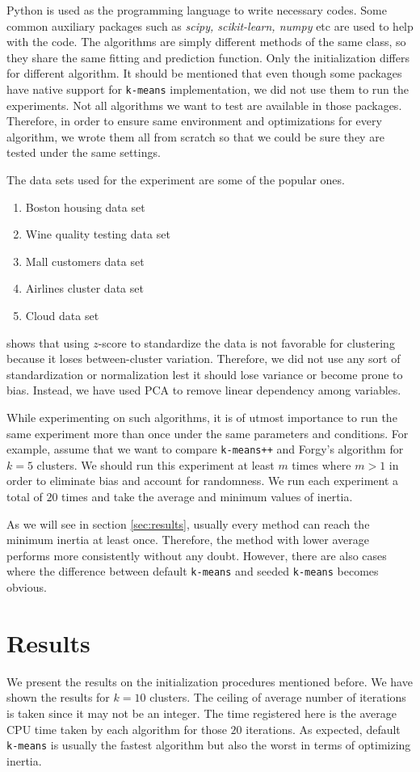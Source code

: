 \documentclass[twoside, 11pt]{article}
\begin{document}
	Python is used as the programming language to write necessary codes. Some common auxiliary packages such as \textit{scipy, scikit-learn, numpy} etc are used to help with the code. The algorithms are simply different methods of the same class, so they share the same fitting and prediction function. Only the initialization differs for different algorithm. It should be mentioned that even though some packages have native support for \texttt{k-means} implementation, we did not use them to run the experiments. Not all algorithms we want to test are available in those packages. Therefore, in order to ensure same environment and optimizations for every algorithm, we wrote them all from scratch so that we could be sure they are tested under the same settings.
	
	The data sets used for the experiment are some of the popular ones.
		\begin{enumerate}
			\item Boston housing data set
			\item Wine quality testing data set
			\item Mall customers data set
			\item Airlines cluster data set
			\item Cloud data set
		\end{enumerate}
	\cite{miligan} shows that using $z$-score to standardize the data is not favorable for clustering because it loses between-cluster variation. Therefore, we did not use any sort of standardization or normalization lest it should lose variance or become prone to bias. Instead, we have used PCA to remove linear dependency among variables. 
	
	While experimenting on such algorithms, it is of utmost importance to run the same experiment more than once under the same parameters and conditions. For example, assume that we want to compare \texttt{k-means++} and Forgy's algorithm \citep{forgy} for $k=5$ clusters. We should run this experiment at least $m$ times where $m>1$ in order to eliminate bias and account for randomness. We run each experiment a total of $20$ times and take the average and minimum values of inertia.
	
	As we will see in section \eqref{sec:results}, usually every method can reach the minimum inertia at least once. Therefore, the method with lower average performs more consistently without any doubt. However, there are also cases where the difference between default \texttt{k-means} and seeded \texttt{k-means} becomes obvious.
	\section{Results}\label{sec:results}
	We present the results on the initialization procedures mentioned before. We have shown the results for $k=10$ clusters. The ceiling of average number of iterations is taken since it may not be an integer. The time registered here is the average CPU time taken by each algorithm for those $20$ iterations. As expected, default \texttt{k-means} is usually the fastest algorithm but also the worst in terms of optimizing inertia.
	
\end{document}
